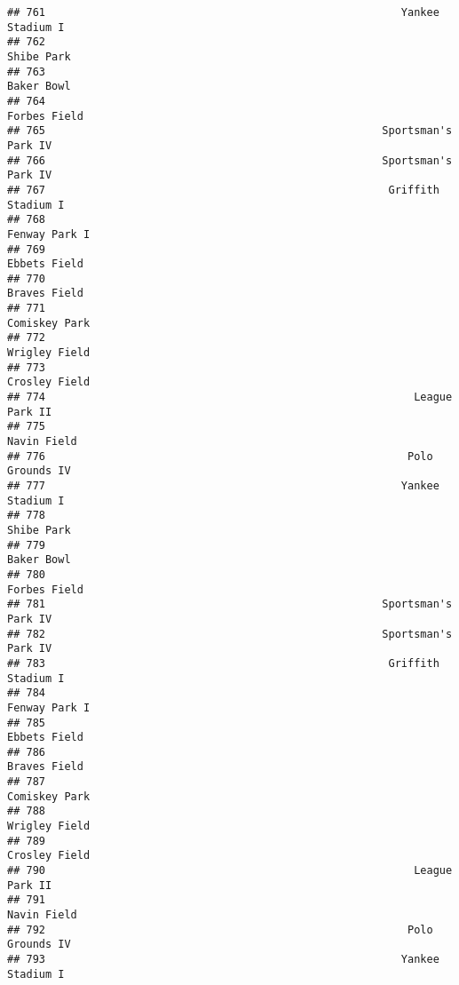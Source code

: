 \documentclass[]{article}
\begin{document}
\begin{verbatim}
## 761                                                        Yankee Stadium I
## 762                                                              Shibe Park
## 763                                                              Baker Bowl
## 764                                                            Forbes Field
## 765                                                     Sportsman's Park IV
## 766                                                     Sportsman's Park IV
## 767                                                      Griffith Stadium I
## 768                                                           Fenway Park I
## 769                                                            Ebbets Field
## 770                                                            Braves Field
## 771                                                           Comiskey Park
## 772                                                           Wrigley Field
## 773                                                           Crosley Field
## 774                                                          League Park II
## 775                                                             Navin Field
## 776                                                         Polo Grounds IV
## 777                                                        Yankee Stadium I
## 778                                                              Shibe Park
## 779                                                              Baker Bowl
## 780                                                            Forbes Field
## 781                                                     Sportsman's Park IV
## 782                                                     Sportsman's Park IV
## 783                                                      Griffith Stadium I
## 784                                                           Fenway Park I
## 785                                                            Ebbets Field
## 786                                                            Braves Field
## 787                                                           Comiskey Park
## 788                                                           Wrigley Field
## 789                                                           Crosley Field
## 790                                                          League Park II
## 791                                                             Navin Field
## 792                                                         Polo Grounds IV
## 793                                                        Yankee Stadium I

\end{verbatim}
\end{document}
